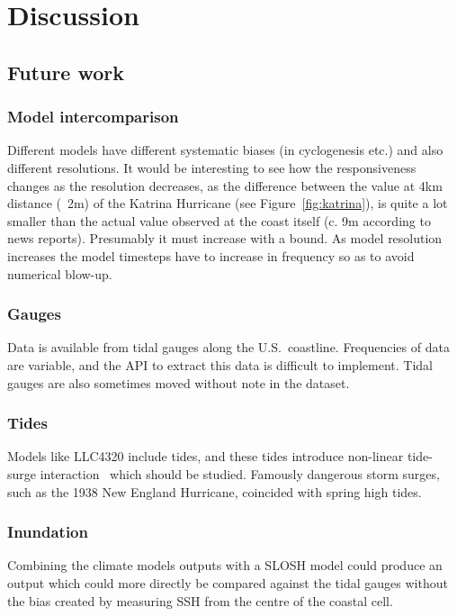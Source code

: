 \section{Discussion}
\label{sec:7_Discussion}

\subsection{Future work}
\label{sec:future}
\subsubsection{Model intercomparison}
Different models have different systematic biases (in cyclogenesis etc.)
and also different resolutions. It would be interesting to see how
the responsiveness changes as the resolution decreases, as the difference
between the value at 4km distance (~2m) of the Katrina Hurricane (see Figure~\ref{fig:katrina}),
is quite a lot smaller than the actual value observed at the coast itself (c. 9m according to news reports).
Presumably it must increase with a bound. As model resolution increases the model
timesteps have to increase in frequency so as to avoid numerical blow-up.

\subsubsection{Gauges}
Data is available from tidal gauges along the U.S.~coastline.
Frequencies of data are variable, and the API to extract this data
is difficult to implement. Tidal gauges are also sometimes moved
without note in the dataset.

\subsubsection{Tides}
Models like LLC4320 include tides, and these tides introduce
non-linear tide-surge interaction~\cite{feng2019characteristics} which should be studied.
Famously dangerous storm surges, such as the 1938 New England
Hurricane, coincided with spring high tides.

\subsubsection{Inundation}
Combining the climate models outputs with a SLOSH model could produce
an output which could more directly be compared against the tidal gauges
without the bias created by measuring SSH from the centre of the coastal
cell.


